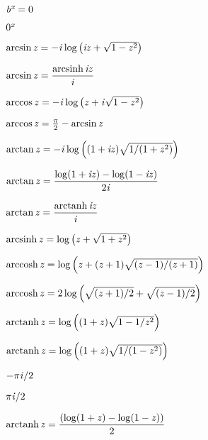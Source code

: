 {\newpage
\clearpage
\samepage ${\it b}^{\hbox{\scriptsize\it x}}=0$
}

{\newpage
\clearpage
\samepage $0^{\hbox{\scriptsize\it x}}$
}

{\newpage
\clearpage
\samepage \( \arcsin {\it z}=-{\it i} \log \left({\it i}{\it z}+\sqrt{1-{\it z}^2}\right) \)
}

{\newpage
\clearpage
\samepage \( \displaystyle \arcsin {\it z} = { \mathop{\rm arcsinh}\nolimits {\it i}{\it z} \over {\it i} }\)
}

{\newpage
\clearpage
\samepage \( \arccos {\it z}=-{\it i} \log \left({\it z}+{\it i} \sqrt{1-{\it z}^2}\right) \)
}

{\newpage
\clearpage
\samepage \( \arccos {\it z}={\pi \over 2}-\arcsin {\it z} \)
}

{\newpage
\clearpage
\samepage \( \arctan {\it z}=-{\it i} \log \left((1+{\it i} {\it z}) \sqrt{1/(1+{\it z}^2)}\right)\)
}

{\newpage
\clearpage
\samepage \( \displaystyle \arctan {\it z} = { \log (1+{\it i}{\it z}) - \log (1-{\it i}{\it z}) \over 2{\it i} }\)
}

{\newpage
\clearpage
\samepage \( \displaystyle \arctan {\it z} = { \mathop{\rm arctanh}\nolimits {\it i}{\it z} \over {\it i} }\)
}

{\newpage
\clearpage
\samepage \( \mathop{\rm arcsinh}\nolimits {\it z}=\log \left({\it z}+\sqrt{1+{\it z}^2}\right)\)
}

{\newpage
\clearpage
\samepage \( \mathop{\rm arccosh}\nolimits {\it z}=\log \left({\it z}+({\it z}+1)\sqrt{({\it z}-1)/({\it z}+1)}\right) \)
}

{\newpage
\clearpage
\samepage \( \mathop{\rm arccosh}\nolimits {\it z}=2 \log \left(  \sqrt{({\it z}+1)/2} + \sqrt{({\it z}-1)/2} \right) \)
}

{\newpage
\clearpage
\samepage \( \mathop{\rm arctanh}\nolimits {\it z}=\log \left((1+{\it z})\sqrt{1-1/{\it z}^2}\right) \)
}

{\newpage
\clearpage
\samepage \( \mathop{\rm arctanh}\nolimits {\it z}=\log \left((1+{\it z})\sqrt{1/(1-{\it z}^2)}\right) \)
}

{\newpage
\clearpage
\samepage $-\pi {\it i}/2$
}

{\newpage
\clearpage
\samepage $\pi {\it i}/2$
}

{\newpage
\clearpage
\samepage \( \displaystyle \mathop{\rm arctanh}\nolimits {\it z}= { \left(\log(1+{\it z}) - \log(1-{\it z})\right) \over 2 } \)
}

